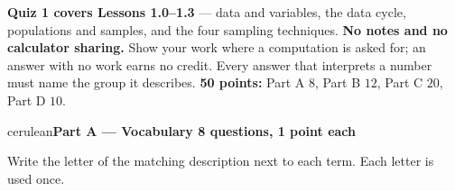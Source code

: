 \documentclass[10pt]{article}
\newcommand{\parthead}[1]{%
  \vspace{6pt}\noindent
  {\tcbset{after={\par\nopagebreak}}%
   \begin{headlinebox}{cerulean}{\color{white}\bfseries #1}\end{headlinebox}}%
  \nopagebreak\vspace{4pt}}
\begin{document}

\vspace{0.10in}
\begin{remindbox}
\small
\textbf{Quiz 1 covers Lessons 1.0--1.3} --- data and variables, the data cycle, populations and
samples, and the four sampling techniques. \textbf{No notes and no calculator sharing.} Show
your work where a computation is asked for; an answer with no work earns no credit. Every
answer that interprets a number must name the group it describes.
\textbf{50 points:} Part A $8$, Part B $12$, Part C $20$, Part D $10$.
\end{remindbox}

\parthead{Part A --- Vocabulary \hfill 8 questions, 1 point each}

\small
Write the letter of the matching description next to each term. Each letter is used once.
\end{document}
